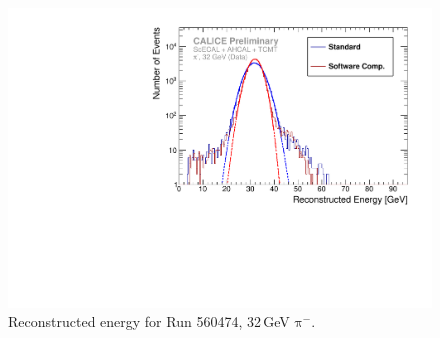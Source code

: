 \documentclass[twoside,a4paper,12pt]{article}
\newcommand\piminus{\(\mathrm{\pi^-}\)}
\begin{document}
\begin{figure}[htbp]
\begin{center}
\includegraphics[width=1\textwidth,page=1]{ERec_classic_SC_560474_data}
\caption{Reconstructed energy for Run 560474, 32\,GeV \piminus.}
\label{fig:erec_32gev}
\end{center}
\end{figure}
\end{document}
